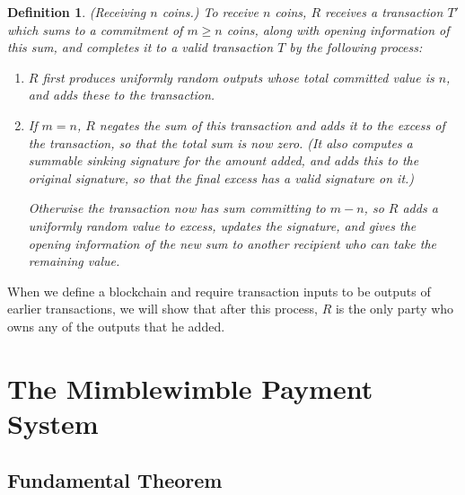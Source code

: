 \documentclass[letterpaper]{article}
\newtheorem{defn}{Definition}
\begin{document}
\begin{defn} (Receiving $n$ coins.) To receive $n$ coins, $R$ receives
a transaction $T'$ which sums to a commitment of $m\geq n$ coins, along
with opening information of this sum, and completes it to a valid
transaction $T$ by the following process:
\begin{enumerate}
\item $R$ first produces uniformly random outputs whose total committed
value is $n$, and adds these to the transaction.
\item If $m = n$, $R$ negates the sum of this transaction and adds it
to the excess of the transaction, so that the total sum is now zero.
(It also computes a summable sinking signature for the amount added,
and adds this to the original signature, so that the final excess has
a valid signature on it.)

Otherwise the transaction now has sum committing to $m - n$, so $R$ adds
a uniformly random value to excess, updates the signature, and gives the
opening information of the new sum to another recipient who can take the
remaining value.
\end{enumerate}
\label{receive}
\end{defn}
When we define a blockchain and require transaction inputs to be outputs
of earlier transactions, we will show that after this process, $R$ is
the only party who owns any of the outputs that he added.

\section{The Mimblewimble Payment System}

\subsection{Fundamental Theorem}
\end{document}
